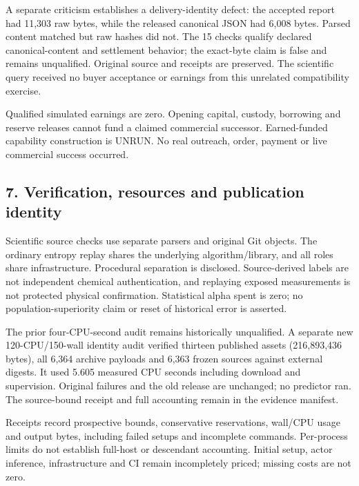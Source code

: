 \documentclass[
  10pt,
]{article}
\begin{document}
A separate criticism establishes a delivery-identity defect: the
accepted report had 11,303 raw bytes, while the released canonical JSON
had 6,008 bytes. Parsed content matched but raw hashes did not. The 15
checks qualify declared canonical-content and settlement behavior; the
exact-byte claim is false and remains unqualified. Original source and
receipts are preserved. The scientific query received no buyer
acceptance or earnings from this unrelated compatibility exercise.

Qualified simulated earnings are zero. Opening capital, custody,
borrowing and reserve releases cannot fund a claimed commercial
successor. Earned-funded capability construction is UNRUN. No real
outreach, order, payment or live commercial success occurred.

\hypertarget{verification-resources-and-publication-identity}{%
\subsection{7. Verification, resources and publication
identity}\label{verification-resources-and-publication-identity}}

Scientific source checks use separate parsers and original Git objects.
The ordinary entropy replay shares the underlying algorithm/library, and
all roles share infrastructure. Procedural separation is disclosed.
Source-derived labels are not independent chemical authentication, and
replaying exposed measurements is not protected physical confirmation.
Statistical alpha spent is zero; no population-superiority claim or
reset of historical error is asserted.

The prior four-CPU-second audit remains historically unqualified. A
separate new 120-CPU/150-wall identity audit verified thirteen published
assets (216,893,436 bytes), all 6,364 archive payloads and 6,363 frozen
sources against external digests. It used 5.605 measured CPU seconds
including download and supervision. Original failures and the old
release are unchanged; no predictor ran. The source-bound receipt and
full accounting remain in the evidence manifest.

Receipts record prospective bounds, conservative reservations, wall/CPU
usage and output bytes, including failed setups and incomplete commands.
Per-process limits do not establish full-host or descendant accounting.
Initial setup, actor inference, infrastructure and CI remain
incompletely priced; missing costs are not zero.
\end{document}

